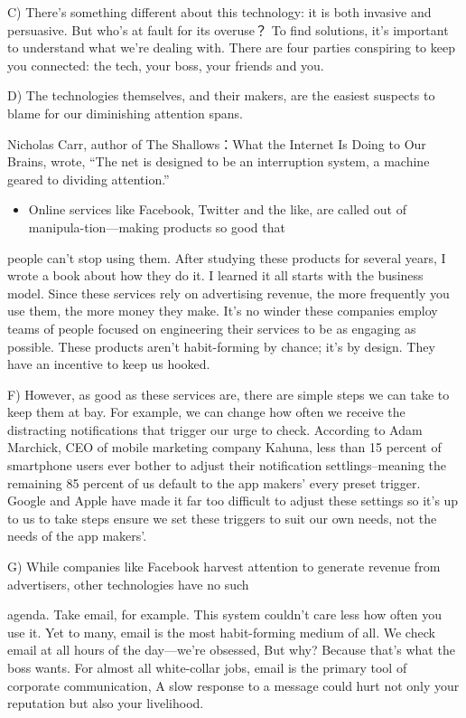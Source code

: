 \documentclass[UTF8,11pt]{ctexart}
\begin{document}
C) There's something different about this technology: it is both invasive and persuasive. But who's at fault for its overuse？ To find solutions, it's important to understand what we’re dealing with. There are four parties conspiring to keep you connected: the tech, your boss, your friends and you.


D) The technologies themselves, and their makers, are the easiest suspects to blame for our diminishing attention spans.


Nicholas Carr, author of The Shallows：What the Internet Is Doing to Our Brains, wrote, “The net is designed to be an interruption system, a machine geared to dividing attention.”


\begin{itemize}[leftmargin=2em,itemsep=.2em,topsep=.4em]\item[E.] Online services like Facebook, Twitter and the like, are called out of manipula-tion—making products so good that
\end{itemize}

people can’t stop using them. After studying these products for several years, I wrote a book about how they do it. I learned it all starts with the business model. Since these services rely on advertising revenue, the more frequently you use them, the more money they make. It’s no winder these companies employ teams of people focused on engineering their services to be as engaging as possible. These products aren't habit-forming by chance; it's by design. They have an incentive to keep us hooked.


F) However, as good as these services are, there are simple steps we can take to keep them at bay. For example, we can change how often we receive the distracting notifications that trigger our urge to check. According to Adam Marchick, CEO of mobile marketing company Kahuna, less than 15 percent of smartphone users ever bother to adjust their notification settlings--meaning the remaining 85 percent of us default to the app makers' every preset trigger. Google and Apple have made it far too difficult to adjust these settings so it's up to us to take steps ensure we set these triggers to suit our own needs, not the needs of the app makers’.


G) While companies like Facebook harvest attention to generate revenue from advertisers, other technologies have no such


agenda. Take email, for example. This system couldn’t care less how often you use it. Yet to many, email is the most habit-forming medium of all. We check email at all hours of the day—we’re obsessed, But why? Because that’s what the boss wants. For almost all white-collar jobs, email is the primary tool of corporate communication, A slow response to a message could hurt not only your reputation but also your livelihood.
\end{document}
